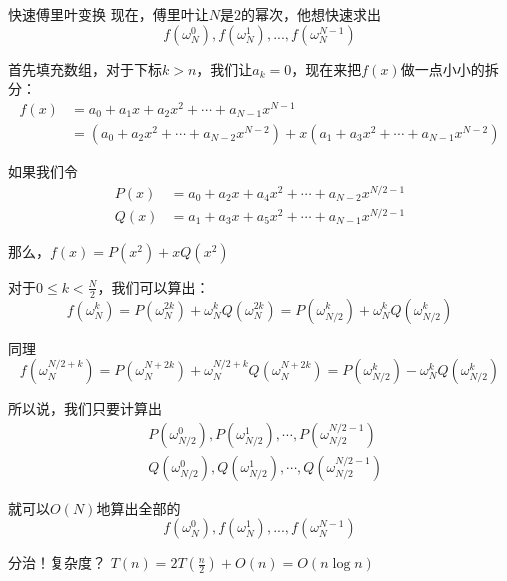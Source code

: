 \documentclass{beamer}
\begin{document}
\begin{frame}{快速傅里叶变换}
    现在，傅里叶让$N$是$2$的幂次，他想快速求出
    \begin{equation*}
        f(\omega_N^0),f(\omega_N^1),...,f(\omega_N^{N-1})
    \end{equation*}

    \pause
    首先填充数组，对于下标$k>n$，我们让$a_k=0$，现在来把$f(x)$做一点小小的拆分：
    \begin{align*}
        f(x)&=a_0 + a_1x+ a_2x^2 + \cdots + a_{N-1}x^{N-1}\\
        &= (a_0+a_2x^2+\cdots + a_{N-2}x^{N-2}) + x(a_1+a_3x^2+\cdots + a_{N-1}x^{N-2})
    \end{align*}

    \pause
    如果我们令
    \begin{align*}
        P(x)&= a_0+a_2x+ a_4x^2 + \cdots + a_{N-2}x^{N/2-1}\\
        Q(x)&= a_1+a_3x+ a_5x^2 + \cdots + a_{N-1}x^{N/2-1}
    \end{align*}

    \pause
    那么，$f(x)=P(x^2)+xQ(x^2)$
\end{frame}

\begin{frame}
    对于$0\leq k <\frac{N}{2}$，我们可以算出：
    \begin{equation*}
        f(\omega_N^k)=P(\omega_N^{2k})+\omega_N^{k} Q(\omega_N^{2k})=P(\omega_{N/2}^{k})+\omega_N^{k} Q(\omega_{N/2}^{k})
    \end{equation*}
    
    同理
    \begin{equation*}
        f(\omega_N^{N/2+k})=P(\omega_N^{N+2k})+\omega_N^{N/2+k} Q(\omega_N^{N+2k})=P(\omega_{N/2}^{k})-\omega_N^{k} Q(\omega_{N/2}^{k})
    \end{equation*}

    \pause
    所以说，我们只要计算出
    \begin{align*}
        &P(\omega_{N/2}^0),P(\omega_{N/2}^1),\cdots , P(\omega_{N/2}^{N/2-1})\\
        &Q(\omega_{N/2}^0),Q(\omega_{N/2}^1),\cdots , Q(\omega_{N/2}^{N/2-1})
    \end{align*}

    就可以$O(N)$地算出全部的
    \begin{equation*}
        f(\omega_N^0),f(\omega_N^1),...,f(\omega_N^{N-1})
    \end{equation*}

    \pause
    分治！复杂度？
    \pause
    $T(n)=2T\left(\frac{n}{2}\right)+O(n)=O(n\log n)$
\end{frame}
\end{document}
